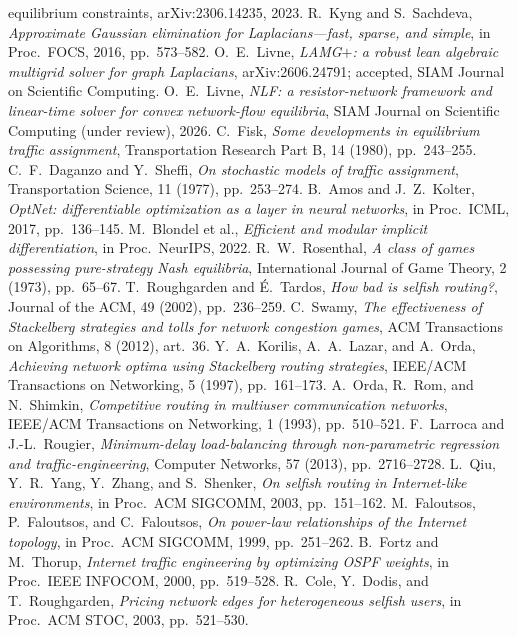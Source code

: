 \documentclass[ijoc]{informs3}
\begin{document}
\begin{thebibliography}{}
{equilibrium constraints}, arXiv:2306.14235, 2023.
 R.~Kyng and S.~Sachdeva, \emph{Approximate Gaussian elimination for Laplacians---fast,
sparse, and simple}, in Proc.\ FOCS, 2016, pp.~573--582.
 O.~E.~Livne, \emph{LAMG$+$: a robust lean algebraic multigrid solver for graph Laplacians},
arXiv:2606.24791; accepted, SIAM Journal on Scientific Computing.
 O.~E.~Livne, \emph{NLF: a resistor-network framework and linear-time solver for convex network-flow
equilibria}, SIAM Journal on Scientific Computing (under review), 2026.
 C.~Fisk, \emph{Some developments in equilibrium traffic assignment}, Transportation Research
Part B, 14 (1980), pp.~243--255.
 C.~F.~Daganzo and Y.~Sheffi, \emph{On stochastic models of traffic assignment},
Transportation Science, 11 (1977), pp.~253--274.
 B.~Amos and J.~Z.~Kolter, \emph{OptNet: differentiable optimization as a layer in neural
networks}, in Proc.\ ICML, 2017, pp.~136--145.
 M.~Blondel et al., \emph{Efficient and modular implicit differentiation}, in Proc.\
NeurIPS, 2022.
 R.~W.~Rosenthal, \emph{A class of games possessing pure-strategy Nash equilibria},
International Journal of Game Theory, 2 (1973), pp.~65--67.
 T.~Roughgarden and \'E.~Tardos, \emph{How bad is selfish routing?}, Journal of the
ACM, 49 (2002), pp.~236--259.
 C.~Swamy, \emph{The effectiveness of Stackelberg strategies and tolls for network congestion
games}, ACM Transactions on Algorithms, 8 (2012), art.~36.
 Y.~A.~Korilis, A.~A.~Lazar, and A.~Orda, \emph{Achieving network optima using Stackelberg
routing strategies}, IEEE/ACM Transactions on Networking, 5 (1997), pp.~161--173.
\bibitem[Orda et al.(1993)]{orda1993} A.~Orda, R.~Rom, and N.~Shimkin, \emph{Competitive routing in multiuser communication
networks}, IEEE/ACM Transactions on Networking, 1 (1993), pp.~510--521.
\bibitem[Larroca and Rougier(2013)]{larroca2013} F.~Larroca and J.-L.~Rougier, \emph{Minimum-delay load-balancing through non-parametric
regression and traffic-engineering}, Computer Networks, 57 (2013), pp.~2716--2728.
\bibitem[Qiu et al.(2003)]{qiu2003} L.~Qiu, Y.~R.~Yang, Y.~Zhang, and S.~Shenker, \emph{On selfish routing in Internet-like
environments}, in Proc.\ ACM SIGCOMM, 2003, pp.~151--162.
 M.~Faloutsos, P.~Faloutsos, and C.~Faloutsos, \emph{On power-law relationships of the
Internet topology}, in Proc.\ ACM SIGCOMM, 1999, pp.~251--262.
 B.~Fortz and M.~Thorup, \emph{Internet traffic engineering by optimizing OSPF weights}, in
Proc.\ IEEE INFOCOM, 2000, pp.~519--528.
 R.~Cole, Y.~Dodis, and T.~Roughgarden, \emph{Pricing network edges for heterogeneous selfish
users}, in Proc.\ ACM STOC, 2003, pp.~521--530.
\end{thebibliography}
\end{document}
